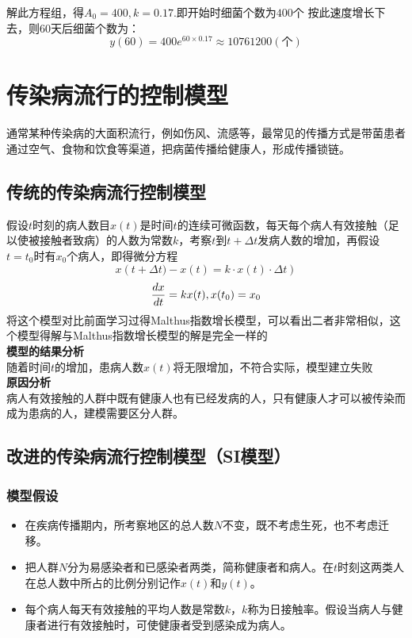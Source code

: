 \documentclass[openany]{progbookcn}
\begin{document}
\indent 解此方程组，得$A_0=400,k=0.17$.即开始时细菌个数为$400$个
\indent 按此速度增长下去，则60天后细菌个数为：
\begin{equation}\nonumber
y(60)=400e^{60\times 0.17}\approx 10761200(\mbox{个})
\end{equation}


\section{传染病流行的控制模型}
\indent 通常某种传染病的大面积流行，例如伤风、流感等，最常见的传播方式是带菌患者通过空气、食物和饮食等渠道，把病菌传播给健康人，形成传播锁链。
\subsection{传统的传染病流行控制模型}
\indent 假设$t$时刻的病人数目$x(t)$是时间$t$的连续可微函数，每天每个病人有效接触（足以使被接触者致病）的人数为常数$k$，考察$t$到$t+\Delta t$发病人数的增加，再假设$t=t_0$时有$x_0$个病人，即得微分方程
\begin{equation}
x(t+\Delta{t)}-x(t)=k\cdot x(t)\cdot\Delta{t})
\end{equation}
\begin{equation}
{{dx}\over{dt}}=kx(t),x(t_0)=x_0
\end{equation}
\indent 将这个模型对比前面学习过得Malthus指数增长模型，可以看出二者非常相似，这个模型得解与Malthus指数增长模型的解是完全一样的\\
\noindent\textbf{模型的结果分析}\\
\indent 随着时间$t$的增加，患病人数$x(t)$将无限增加，不符合实际，模型建立失败\\
\noindent\textbf{原因分析}\\
\indent 病人有效接触的人群中既有健康人也有已经发病的人，只有健康人才可以被传染而成为患病的人，建模需要区分人群。
\subsection{改进的传染病流行控制模型（SI模型）}
\subsubsection{模型假设}
\begin{itemize}
\item 在疾病传播期内，所考察地区的总人数$N$不变，既不考虑生死，也不考虑迁移。
\item 把人群$N$分为易感染者和已感染者两类，简称健康者和病人。在$t$时刻这两类人在总人数中所占的比例分别记作$x(t)$和$y(t)$。
\item 每个病人每天有效接触的平均人数是常数$k$，$k$称为日接触率。假设当病人与健康者进行有效接触时，可使健康者受到感染成为病人。
\end{itemize}
\end{document}
